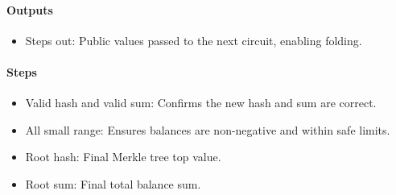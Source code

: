 \paragraph{Outputs}
\begin{itemize}
   \item Steps out: Public values passed to the next circuit, enabling folding.
   \end{itemize}

\paragraph{Steps}
\begin{itemize}
   \item Valid hash and valid sum: Confirms the new hash and sum are correct.
   \item All small range: Ensures balances are non-negative and within safe limits.
   \item Root hash: Final Merkle tree top value.
   \item Root sum: Final total balance sum.
   \end{itemize}




